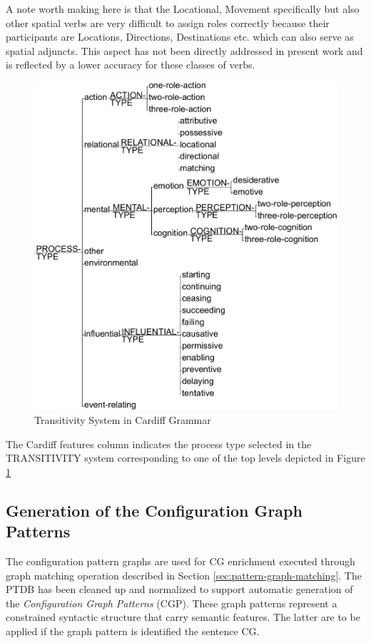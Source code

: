 A note worth making here is that the Locational, Movement specifically but also other spatial verbs are very difficult to assign roles correctly because their participants are Locations, Directions, Destinations etc. which can also serve as spatial adjuncts. This aspect has not been directly addressed in present work and is reflected by a lower accuracy for these classes of verbs. 

\begin{figure}[!ht]
	\centering
	\includegraphics[width=0.7\linewidth]{Figures/SFL-grammar/Transitivity}
	\caption[Transitivity System in Cardiff Grammar]{Transitivity System in Cardiff Grammar}
	\label{fig:transitivity-system}
\end{figure}

The Cardiff features column indicates the process type selected in the TRANSITIVITY system corresponding to one of the top levels depicted in Figure \ref{fig:transitivity-system}

\subsection{Generation of the Configuration Graph Patterns}
\label{sec:gen-sem}
The configuration pattern graphs are used for CG enrichment executed through graph matching operation described in Section \ref{sec:pattern-graph-matching}. The PTDB has been cleaned up and normalized to support automatic generation of the \textit{Configuration Graph Patterns} (CGP). These graph patterns represent a constrained syntactic structure that carry semantic features. The latter are to be applied if the graph pattern is identified the sentence CG. 

